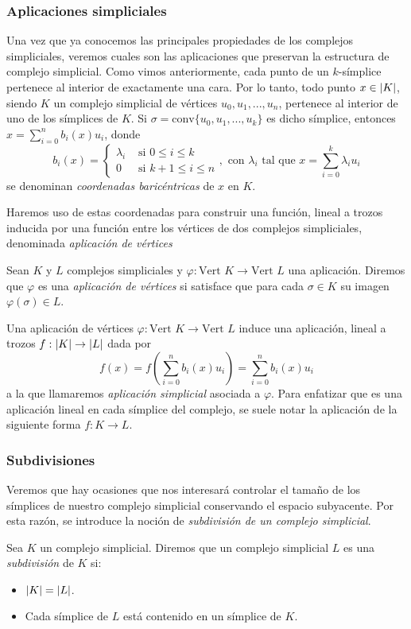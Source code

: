 \subsubsection*{Aplicaciones simpliciales}
Una vez que ya conocemos las principales propiedades de los complejos simpliciales, veremos cuales son las aplicaciones que preservan la estructura de complejo simplicial. Como vimos anteriormente, cada punto de un $k$-símplice pertenece al interior de exactamente una cara. Por lo tanto, todo punto $x \in \lvert K\rvert$, siendo $K$ un complejo simplicial de vértices $u_0, u_1, ..., u_n$, pertenece al interior de uno de los símplices de $K$. Si $\sigma = \text{conv}\{u_0, u_1, ..., u_k\}$ es dicho símplice, entonces $x = \sum_{i=0}^{n} b_i(x)u_i$, donde
\[
b_i(x)=
\begin{cases}
\lambda_i	 & \text{ si } 0 \leq i \leq k \\ 
0 			 & \text{ si } k+1 \leq i \leq n
\end{cases},\text{ con } \lambda_i \text{ tal que } x = \sum_{i=0}^{k} \lambda_i u_i
\]
se denominan \emph{coordenadas baricéntricas} de $x$ en $K$.

Haremos uso de estas coordenadas para construir una función, lineal a trozos inducida por una función entre los vértices de dos complejos simpliciales, denominada \emph{aplicación de vértices}

\begin{definition}
Sean $K$ y $L$ complejos simpliciales y $\varphi:\text{Vert }K \to \text{Vert }L$ una aplicación. Diremos que $\varphi$ es una \emph{aplicación de vértices} si satisface que para cada $\sigma \in K$ su imagen $\varphi(\sigma) \in L$.
\end{definition}

Una aplicación de vértices $\varphi:\text{Vert }K \to \text{Vert }L$ induce una aplicación, lineal a trozos $f: \lvert K\rvert \to \lvert L\rvert$ dada por
\[
f(x) = f\left ( \sum_{i=0}^{n} b_i(x) u_i \right ) =  \sum_{i=0}^{n} b_i(x)u_i
\]
a la que llamaremos \emph{aplicación simplicial} asociada a $\varphi$. Para enfatizar que es una aplicación lineal en cada símplice del complejo, se suele notar la aplicación de la siguiente forma $f: K \to L$. 

\subsubsection*{Subdivisiones}
Veremos que hay ocasiones que nos interesará controlar el tamaño de los símplices de nuestro complejo simplicial conservando el espacio subyacente. Por esta razón, se introduce la noción de \emph{subdivisión de un complejo simplicial}.
\begin{definition}
Sea $K$ un complejo simplicial. Diremos que un complejo simplicial $L$ es una \emph{subdivisión} de $K$ si:
\begin{itemize}
	\item $\lvert K\rvert=\lvert L\rvert$.
	\item Cada símplice de $L$ está contenido en un símplice de $K$.
\end{itemize}
\end{definition}

